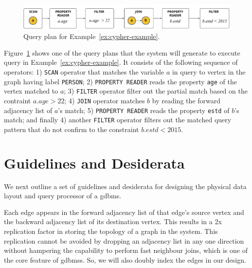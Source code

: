 \begin{figure}
	\hfill\includegraphics[scale=0.78]{img/ex-qp}\hfill
	\vspace{-10pt}
	\caption{Query plan for Example~\ref{ex:cypher-example}.}
	\vspace{-8pt}
	\label{fig:ex-qp}
\end{figure}

Figure~\ref{fig:ex-qp} shows one of the query plans that the system will generate to execute query in Example~\ref{ex:cypher-example}. It consists of the following sequence of operators: 1) \texttt{SCAN} operator that matches the variable $a$ in query to vertex in the graph having label \texttt{PERSON}; 2) \texttt{PROPERTY READER} reads the property \texttt{age} of the vertex matched to $a$; 3) \texttt{FILTER} operator filter out the partial match based on the contraint $a.age>22$; 4) \texttt{JOIN} operator matches $b$ by reading the forward adjacency list of $a$'s match; 5) \texttt{PROPERTY READER} reads the property \texttt{estd} of $b$'s match; and finally 4) another \texttt{FILTER} operator filters out the matched query pattern that do not confirm to the constraint $b.estd < 2015$.

\section{Guidelines and Desiderata}
\label{sec:guidelines}

We next outline a set of guidelines and desiderata for designing the physical data layout and query processor of a \gls{gdbms}.

\begin{guideline}
	\vspace{-5pt}
	Each edge appears in the forward adjacency list of that edge's source vertex and the backward adjacency list of its destination vertex. This results in a 2x replication factor in storing the topology of a graph in the system. This replication cannot be avoided by dropping an adjacency list in any one direction without hampering the capability to perform fast neighbour joins, which is one of the core feature of \gls{gdbms}s. So, we will also doubly index the edges in our design.
\end{guideline}


